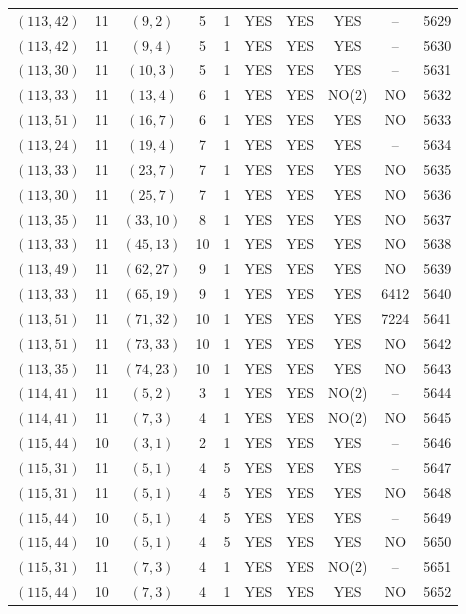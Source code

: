 \begin{longtable}{|c|c|c|c|c|c|c|c|c|c|}
$(113, 42)$ & 11 & $(9, 2)$ & 5 & 1 & YES & YES & YES & -- & 5629\\
$(113, 42)$ & 11 & $(9, 4)$ & 5 & 1 & YES & YES & YES & -- & 5630\\
$(113, 30)$ & 11 & $(10, 3)$ & 5 & 1 & YES & YES & YES & -- & 5631\\
$(113, 33)$ & 11 & $(13, 4)$ & 6 & 1 & YES & YES & NO(2) & NO & 5632\\
$(113, 51)$ & 11 & $(16, 7)$ & 6 & 1 & YES & YES & YES & NO & 5633\\
$(113, 24)$ & 11 & $(19, 4)$ & 7 & 1 & YES & YES & YES & -- & 5634\\
$(113, 33)$ & 11 & $(23, 7)$ & 7 & 1 & YES & YES & YES & NO & 5635\\
$(113, 30)$ & 11 & $(25, 7)$ & 7 & 1 & YES & YES & YES & NO & 5636\\
$(113, 35)$ & 11 & $(33, 10)$ & 8 & 1 & YES & YES & YES & NO & 5637\\
$(113, 33)$ & 11 & $(45, 13)$ & 10 & 1 & YES & YES & YES & NO & 5638\\
$(113, 49)$ & 11 & $(62, 27)$ & 9 & 1 & YES & YES & YES & NO & 5639\\
$(113, 33)$ & 11 & $(65, 19)$ & 9 & 1 & YES & YES & YES & 6412 & 5640\\
$(113, 51)$ & 11 & $(71, 32)$ & 10 & 1 & YES & YES & YES & 7224 & 5641\\
$(113, 51)$ & 11 & $(73, 33)$ & 10 & 1 & YES & YES & YES & NO & 5642\\
$(113, 35)$ & 11 & $(74, 23)$ & 10 & 1 & YES & YES & YES & NO & 5643\\
$(114, 41)$ & 11 & $(5, 2)$ & 3 & 1 & YES & YES & NO(2) & -- & 5644\\
$(114, 41)$ & 11 & $(7, 3)$ & 4 & 1 & YES & YES & NO(2) & NO & 5645\\
$(115, 44)$ & 10 & $(3, 1)$ & 2 & 1 & YES & YES & YES & -- & 5646\\
$(115, 31)$ & 11 & $(5, 1)$ & 4 & 5 & YES & YES & YES & -- & 5647\\
$(115, 31)$ & 11 & $(5, 1)$ & 4 & 5 & YES & YES & YES & NO & 5648\\
$(115, 44)$ & 10 & $(5, 1)$ & 4 & 5 & YES & YES & YES & -- & 5649\\
$(115, 44)$ & 10 & $(5, 1)$ & 4 & 5 & YES & YES & YES & NO & 5650\\
$(115, 31)$ & 11 & $(7, 3)$ & 4 & 1 & YES & YES & NO(2) & -- & 5651\\
$(115, 44)$ & 10 & $(7, 3)$ & 4 & 1 & YES & YES & YES & NO & 5652\\

\end{longtable}
